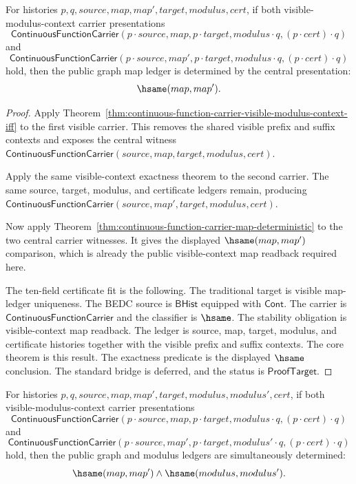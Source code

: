 \begin{theorem}
\label{thm:continuous-function-carrier-visible-modulus-context-map-deterministic}
For histories $p,q,source,map,map',target,modulus,cert$, if both
visible-modulus-context carrier presentations
$$
\mathsf{ContinuousFunctionCarrier}(p\cdot source,map,p\cdot target,
modulus\cdot q,(p\cdot cert)\cdot q)
$$
and
$$
\mathsf{ContinuousFunctionCarrier}(p\cdot source,map',p\cdot target,
modulus\cdot q,(p\cdot cert)\cdot q)
$$
hold, then the public graph map ledger is determined by the central
presentation:
$$
\hsame(map,map').
$$
\end{theorem}
\begin{proof}
Apply Theorem~\ref{thm:continuous-function-carrier-visible-modulus-context-iff}
to the first visible carrier. This removes the shared visible prefix and suffix
contexts and exposes the central witness
$\mathsf{ContinuousFunctionCarrier}(source,map,target,modulus,cert)$.

Apply the same visible-context exactness theorem to the second carrier. The same
source, target, modulus, and certificate ledgers remain, producing
$\mathsf{ContinuousFunctionCarrier}(source,map',target,modulus,cert)$.

Now apply Theorem~\ref{thm:continuous-function-carrier-map-deterministic} to the
two central carrier witnesses. It gives the displayed $\hsame(map,map')$
comparison, which is already the public visible-context map readback required
here.

The ten-field certificate fit is the following. The traditional target is
visible map-ledger uniqueness. The BEDC source is $\mathsf{BHist}$ equipped with
$\mathsf{Cont}$. The carrier is $\mathsf{ContinuousFunctionCarrier}$ and the
classifier is $\hsame$. The stability obligation is visible-context map
readback. The ledger is source, map, target, modulus, and certificate histories
together with the visible prefix and suffix contexts. The core theorem is this
result. The exactness predicate is the displayed $\hsame$ conclusion. The
standard bridge is deferred, and the status is $\mathsf{ProofTarget}$.
\end{proof}
\begin{theorem}
\label{thm:continuous-function-carrier-visible-modulus-context-graph-modulus-deterministic}
For histories $p,q,source,map,map',target,modulus,modulus',cert$, if both
visible-modulus-context carrier presentations
$$
\mathsf{ContinuousFunctionCarrier}(p\cdot source,map,p\cdot target,
modulus\cdot q,(p\cdot cert)\cdot q)
$$
and
$$
\mathsf{ContinuousFunctionCarrier}(p\cdot source,map',p\cdot target,
modulus'\cdot q,(p\cdot cert)\cdot q)
$$
hold, then the public graph and modulus ledgers are simultaneously determined:
$$
\hsame(map,map')\land\hsame(modulus,modulus').
$$
\end{theorem}
